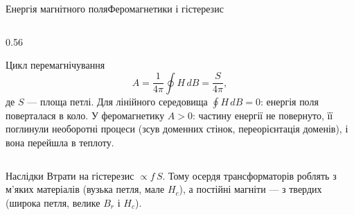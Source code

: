 \documentclass[onlytextwidth]{beamer}
\begin{document}
\begin{frame}{Енергія магнітного поля}{Феромагнетики і гістерезис}
\begin{onlyenv}
\begin{columns}[T]
\begin{column}{0.56\linewidth}
\begin{block}{Цикл перемагнічування}
					\begin{equation*}
						A = \frac{1}{4\pi}\oint H\,dB = \frac{S}{4\pi},
					\end{equation*}
					де $S$ --- площа петлі. Для лінійного середовища $\oint H\,dB = 0$: енергія поля поверталася в коло. У феромагнетику
					$A > 0$: частину енергії \alert{не повернуто}, її поглинули необоротні процеси (зсув доменних стінок, переорієнтація
					доменів), і вона перейшла в \alert{теплоту}.
				\end{block}
			\end{column}
		\end{columns}
		\begin{block}{Наслідки}\justifying
			Втрати на гістерезис $\propto f\,S$. Тому осердя трансформаторів роблять з \alert{м'яких} матеріалів (вузька петля, мале $H_c$), а
			постійні магніти --- з \alert{твердих} (широка петля, велике $B_r$ і $H_c$).
		\end{block}
	\end{onlyenv}
\end{frame}
\end{document}
